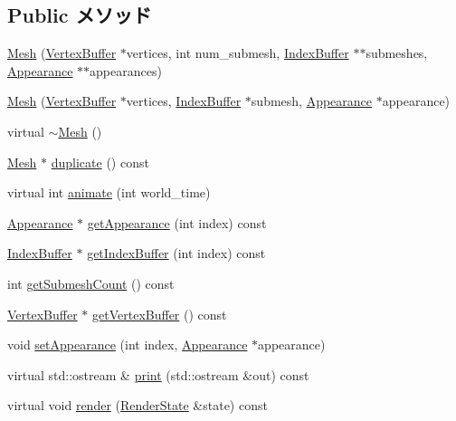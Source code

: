 \subsection*{Public メソッド}
\begin{CompactItemize}
\item 
\hyperlink{classm3g_1_1Mesh_f2c80c243fdcd32b07c77d2ab3d565ab}{Mesh} (\hyperlink{classm3g_1_1VertexBuffer}{VertexBuffer} $\ast$vertices, int num\_\-submesh, \hyperlink{classm3g_1_1IndexBuffer}{IndexBuffer} $\ast$$\ast$submeshes, \hyperlink{classm3g_1_1Appearance}{Appearance} $\ast$$\ast$appearances)
\item 
\hyperlink{classm3g_1_1Mesh_2d7766ebbb63eccd77d0dd8b53b400a3}{Mesh} (\hyperlink{classm3g_1_1VertexBuffer}{VertexBuffer} $\ast$vertices, \hyperlink{classm3g_1_1IndexBuffer}{IndexBuffer} $\ast$submesh, \hyperlink{classm3g_1_1Appearance}{Appearance} $\ast$appearance)
\item 
virtual \hyperlink{classm3g_1_1Mesh_6e26384cfb03023e7dc2e5419baf813f}{$\sim$Mesh} ()
\item 
\hyperlink{classm3g_1_1Mesh}{Mesh} $\ast$ \hyperlink{classm3g_1_1Mesh_52ce6d0b3eda2bd3a95bfb5b7dbb6f82}{duplicate} () const 
\item 
virtual int \hyperlink{classm3g_1_1Mesh_8aad1ceab4c2a03609c8a42324ce484d}{animate} (int world\_\-time)
\item 
\hyperlink{classm3g_1_1Appearance}{Appearance} $\ast$ \hyperlink{classm3g_1_1Mesh_4950a19e02c022dcf41a086117eb8219}{getAppearance} (int index) const 
\item 
\hyperlink{classm3g_1_1IndexBuffer}{IndexBuffer} $\ast$ \hyperlink{classm3g_1_1Mesh_ca34a663f46ce20e2b894c046714ea1d}{getIndexBuffer} (int index) const 
\item 
int \hyperlink{classm3g_1_1Mesh_5dc5a57ad549eb97504c2a1280a882dd}{getSubmeshCount} () const 
\item 
\hyperlink{classm3g_1_1VertexBuffer}{VertexBuffer} $\ast$ \hyperlink{classm3g_1_1Mesh_7602e9bf450fa8b3ec3c60e2e88cba25}{getVertexBuffer} () const 
\item 
void \hyperlink{classm3g_1_1Mesh_bb03b872c453c4f8f3fe31e8b54d1b52}{setAppearance} (int index, \hyperlink{classm3g_1_1Appearance}{Appearance} $\ast$appearance)
\item 
virtual std::ostream \& \hyperlink{classm3g_1_1Mesh_6fea17fa1532df3794f8cb39cb4f911f}{print} (std::ostream \&out) const 
\item 
virtual void \hyperlink{classm3g_1_1Mesh_8babc8a79b78615da51161e94029eea9}{render} (\hyperlink{structm3g_1_1RenderState}{RenderState} \&state) const 
\end{CompactItemize}
